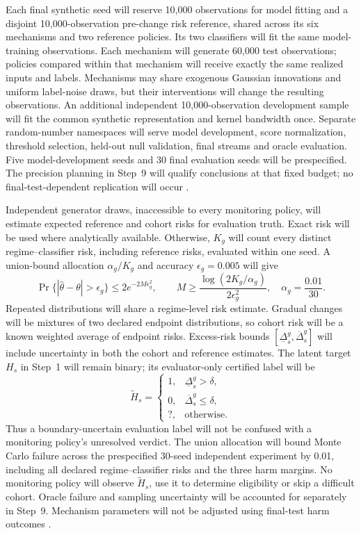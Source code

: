 Each final synthetic seed will reserve 10,000 observations for model fitting and a disjoint 10,000-observation pre-change risk reference, shared across its six mechanisms and two reference policies. Its two classifiers will fit the same model-training observations. Each mechanism will generate 60,000 test observations; policies compared within that mechanism will receive exactly the same realized inputs and labels. Mechanisms may share exogenous Gaussian innovations and uniform label-noise draws, but their interventions will change the resulting observations. An additional independent 10,000-observation development sample will fit the common synthetic representation and kernel bandwidth once. Separate random-number namespaces will serve model development, score normalization, threshold selection, held-out null validation, final streams and oracle evaluation. Five model-development seeds and 30 final evaluation seeds will be prespecified. The precision planning in Step~9 will qualify conclusions at that fixed budget; no final-test-dependent replication will occur \cite{souza,cerqueira}.

Independent generator draws, inaccessible to every monitoring policy, will estimate expected reference and cohort risks for evaluation truth. Exact risk will be used where analytically available. Otherwise, $K_g$ will count every distinct regime--classifier risk, including reference risks, evaluated within one seed. A union-bound allocation $\alpha_g/K_g$ and accuracy $\epsilon_g=0.005$ will give
\begin{equation}
\Pr\{|\widehat\theta-\theta|>\epsilon_g\}\leq 2e^{-2M\epsilon_g^2},
\qquad M\geq\frac{\log(2K_g/\alpha_g)}{2\epsilon_g^2},\quad
\alpha_g=\frac{0.01}{30}.
\end{equation}
Repeated distributions will share a regime-level risk estimate. Gradual changes will be mixtures of two declared endpoint distributions, so cohort risk will be a known weighted average of endpoint risks. Excess-risk bounds $[\underline\Delta_s^g,\overline\Delta_s^g]$ will include uncertainty in both the cohort and reference estimates. The latent target $H_s$ in Step~1 will remain binary; its evaluator-only certified label will be
\begin{equation}
\widetilde H_s=
\begin{cases}
1,&\underline\Delta_s^g>\delta,\\
0,&\overline\Delta_s^g\leq\delta,\\
?,&\text{otherwise}.
\end{cases}
\end{equation}
Thus a boundary-uncertain evaluation label will not be confused with a monitoring policy's unresolved verdict. The union allocation will bound Monte Carlo failure across the prespecified 30-seed independent experiment by 0.01, including all declared regime--classifier risks and the three harm margins. No monitoring policy will observe $\widetilde H_s$, use it to determine eligibility or skip a difficult cohort. Oracle failure and sampling uncertainty will be accounted for separately in Step~9. Mechanism parameters will not be adjusted using final-test harm outcomes \cite{hoeffding}.

